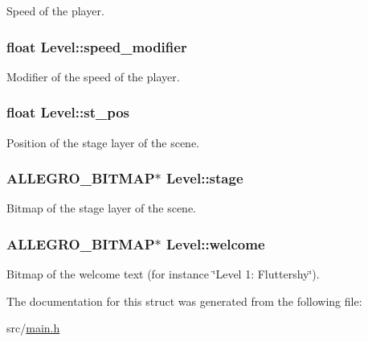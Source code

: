 \-Speed of the player. \hypertarget{structLevel_a0f6fa70a2e0b85437dc1973d1409381f}{
\subsubsection[{speed\-\_\-modifier}]{\setlength{\rightskip}{0pt plus 5cm}float {\bf \-Level\-::speed\-\_\-modifier}}}\label{structLevel_a0f6fa70a2e0b85437dc1973d1409381f}
\-Modifier of the speed of the player. \hypertarget{structLevel_ab13f799d9e2e06a04debbd97676fb512}{
\subsubsection[{st\-\_\-pos}]{\setlength{\rightskip}{0pt plus 5cm}float {\bf \-Level\-::st\-\_\-pos}}}\label{structLevel_ab13f799d9e2e06a04debbd97676fb512}
\-Position of the stage layer of the scene. \hypertarget{structLevel_ad412b858a4e688114dd89a44ecb005bb}{
\subsubsection[{stage}]{\setlength{\rightskip}{0pt plus 5cm}\-A\-L\-L\-E\-G\-R\-O\-\_\-\-B\-I\-T\-M\-A\-P$\ast$ {\bf \-Level\-::stage}}}\label{structLevel_ad412b858a4e688114dd89a44ecb005bb}
\-Bitmap of the stage layer of the scene. \hypertarget{structLevel_a575fec7686bd94b5c35b15d73296c977}{
\subsubsection[{welcome}]{\setlength{\rightskip}{0pt plus 5cm}\-A\-L\-L\-E\-G\-R\-O\-\_\-\-B\-I\-T\-M\-A\-P$\ast$ {\bf \-Level\-::welcome}}}\label{structLevel_a575fec7686bd94b5c35b15d73296c977}
\-Bitmap of the welcome text (for instance \char`\"{}\-Level 1\-: Fluttershy\char`\"{}). 

\-The documentation for this struct was generated from the following file\-:\begin{DoxyCompactItemize}
\item 
src/\hyperlink{main_8h}{main.\-h}\end{DoxyCompactItemize}
